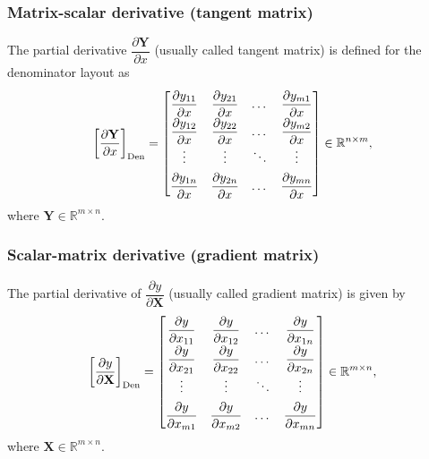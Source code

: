 \documentclass{article}
\begin{document}
\subsubsection{Matrix-scalar derivative (tangent matrix)}
The partial derivative \(\dfrac{\partial \mathbf{Y}}{\partial x}\) (usually called tangent matrix) is defined for the denominator layout as
\begin{align}
    \label{eq:tangent-matrix-den}
    \left[\dfrac{\partial \mathbf{Y}}{\partial x}\right]_{\textnormal{Den}} \renewcommand{\arraystretch}{1.8} = \begin{bmatrix}
        \dfrac{\partial y_{11}}{\partial x} & \dfrac{\partial y_{21}}{\partial x} & \dots & \dfrac{\partial y_{m1}}{\partial x} \\
        \dfrac{\partial y_{12}}{\partial x} & \dfrac{\partial y_{22}}{\partial x} & \dots & \dfrac{\partial y_{m2}}{\partial x} \\
        \vdots & \vdots & \ddots & \vdots \\
        \dfrac{\partial y_{1n}}{\partial x} & \dfrac{\partial y_{2n}}{\partial x} & \dots & \dfrac{\partial y_{mn}}{\partial x} \\
    \end{bmatrix} \in \mathbb{R}^{n \times m},
\end{align}
where \(\mathbf{Y} \in \mathbb{R}^{m \times n}\).%

\subsubsection{Scalar-matrix derivative (gradient matrix)}
The partial derivative of \(\dfrac{\partial y}{\partial \mathbf{X}}\) (usually called gradient matrix) is given by
\begin{align}
    \label{eq:gradient-matrix-den}
    \renewcommand{\arraystretch}{1.8}
			\left[\dfrac{\partial y}{\partial \mathbf{X}}\right]_{\textnormal{Den}} = \begin{bmatrix}
				\dfrac{\partial y}{\partial x_{11}} & \dfrac{\partial y}{\partial x_{12}} & \dots & \dfrac{\partial y}{\partial x_{1n}} \\
				\dfrac{\partial y}{\partial x_{21}} & \dfrac{\partial y}{\partial x_{22}} & \dots & \dfrac{\partial y}{\partial x_{2n}} \\
				\vdots & \vdots & \ddots & \vdots \\
				\dfrac{\partial y}{\partial x_{m1}} & \dfrac{\partial y}{\partial x_{m2}} & \dots & \dfrac{\partial y}{\partial x_{mn}} \\
			\end{bmatrix} \in \mathbb{R}^{m \times n},
\end{align}
where \(\mathbf{X} \in \mathbb{R}^{m \times n}\).
\end{document}
